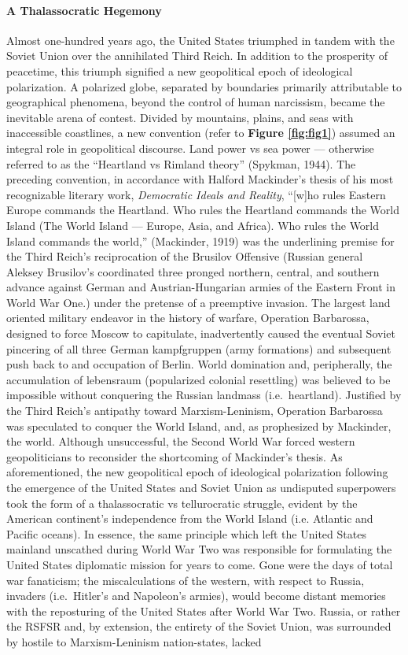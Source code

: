\documentclass[12pt]{article}
\begin{document}
\paragraph{A Thalassocratic Hegemony} Almost one-hundred years ago, the United States triumphed in tandem with the Soviet Union over the annihilated Third Reich. In addition to the prosperity of peacetime, this triumph signified a new geopolitical epoch of ideological polarization. A polarized globe, separated by boundaries primarily attributable to geographical phenomena, beyond the control of human narcissism, became the inevitable arena of contest. Divided by mountains, plains, and seas with inaccessible coastlines, a new convention (refer to \textbf{Figure \ref{fig:fig1}}) assumed an integral role in geopolitical discourse. Land power vs sea power — otherwise referred to as the “Heartland vs Rimland theory” (Spykman, 1944). The preceding convention, in accordance with Halford Mackinder's thesis of his most recognizable literary work, \emph{Democratic Ideals and Reality}, “[w]ho rules Eastern Europe commands the Heartland. Who rules the Heartland commands the World Island (The World Island — Europe, Asia, and Africa). Who rules the World Island commands the world,” (Mackinder, 1919) was the underlining premise for the Third Reich's reciprocation of the Brusilov Offensive (Russian general Aleksey Brusilov's coordinated three pronged northern, central, and southern advance against German and Austrian-Hungarian armies of the Eastern Front in World War One.) under the pretense of a preemptive invasion. The largest land oriented military endeavor in the history of warfare, Operation Barbarossa, designed to force Moscow to capitulate, inadvertently caused the eventual Soviet pincering of all three German kampfgruppen (army formations) and subsequent push back to and occupation of Berlin. World domination and, peripherally, the accumulation of lebensraum (popularized colonial resettling) was believed to be impossible without conquering the Russian landmass (i.e.\ heartland). Justified by the Third Reich's antipathy toward Marxism-Leninism, Operation Barbarossa was speculated to conquer the World Island, and, as prophesized by Mackinder, the world. Although unsuccessful, the Second World War forced western geopoliticians to reconsider the shortcoming of Mackinder's thesis. As aforementioned, the new geopolitical epoch of ideological polarization following the emergence of the United States and Soviet Union as undisputed superpowers took the form of a thalassocratic vs tellurocratic struggle, evident by the American continent's independence from the World Island (i.e. Atlantic and Pacific oceans). In essence, the same principle which left the United States mainland unscathed during World War Two was responsible for formulating the United States diplomatic mission for years to come. Gone were the days of total war fanaticism; the miscalculations of the western, with respect to Russia, invaders (i.e.\ Hitler's and Napoleon's armies), would become distant memories with the reposturing of the United States after World War Two. Russia, or rather the RSFSR and, by extension, the entirety of the Soviet Union, was surrounded by hostile to Marxism-Leninism nation-states, lacked 
\end{document}

